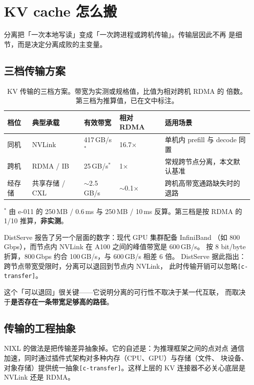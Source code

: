 \section{KV cache 怎么搬}
\label{sec:transfer}

分离把「一次本地写读」变成「一次跨进程或跨机传输」。传输层因此不再
是细节，而是决定分离成败的主变量。

\subsection{三档传输方案}

\begin{table}[t]
\centering
\caption{KV 传输的三档方案。带宽为实测或规格值，比值为相对跨机 RDMA 的
倍数。第三档为推算值，已在文中标注。}
\label{tab:transport}
\small
\setlength{\tabcolsep}{9pt}
\begin{tabular}{@{}p{1.87cm}p{3.45cm}p{2.87cm}p{2.01cm}p{4.17cm}@{}}
\toprule
档位 & 典型承载 & 有效带宽 & 相对 RDMA & 适用场景 \\
\midrule
同机 & NVLink & 417\,GB/s$^{*}$ & 16.7× & 单机内 prefill 与 decode 同置 \\
跨机 & RDMA / IB & 25\,GB/s$^{*}$ & 1× & 常规跨节点分离，本文默认基准 \\
经存储 & 共享存储 / CXL & $\sim$2.5\,GB/s & $\sim$0.1× & 跨机高带宽通路缺失时的退路 \\
\bottomrule
\end{tabular}

\vspace{2pt}
{\footnotesize $^{*}$ 由 e-011 的 250\,MB / 0.6\,ms 与 250\,MB / 10\,ms
反算。第三档是按 RDMA 的 1/10 推算，\textbf{非实测}。}
\end{table}

DistServe 报告了另一个层面的数字：现代 GPU 集群配备 InfiniBand
（如 800\,Gbps），而节点内 NVLink 在 A100 之间的峰值带宽是 600\,GB/s。
按 8 bit/byte 折算，800\,Gbps 约合 100\,GB/s，与 600\,GB/s 相差 6 倍。
DistServe 据此指出：跨节点带宽受限时，分离可以退回到节点内 NVLink，
此时传输开销可以忽略\texttt{[c-transfer]}。

这个「可以退回」很关键——它说明分离的可行性不取决于某一代互联，
而取决于\textbf{是否存在一条带宽足够高的路径}。

\subsection{传输的工程抽象}

NIXL 的做法是把传输差异抽象掉。它的自述是：为推理框架之间的点对点
通信加速，同时通过插件式架构对多种内存（CPU、GPU）与存储（文件、
块设备、对象存储）提供统一抽象\texttt{[c-transfer]}。这样上层的
KV 连接器不必关心底层是 NVLink 还是 RDMA。

